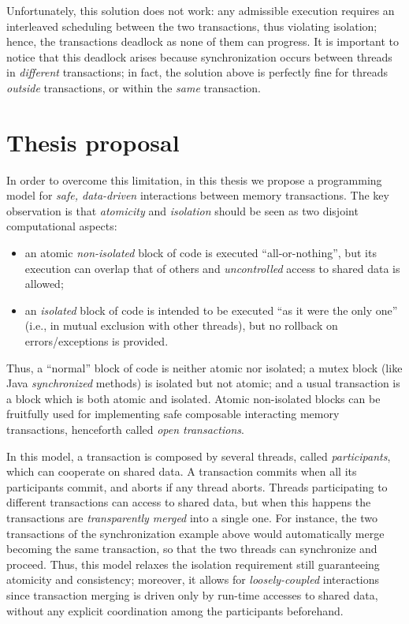 Unfortunately, this solution does not work: any admissible execution requires an interleaved scheduling between the two transactions, thus violating isolation; hence, the transactions deadlock as none of them can progress.
It is important to notice that this deadlock arises because synchronization occurs between threads in \emph{different} transactions;
in fact, the solution above is perfectly fine for threads \emph{outside} transactions, or within the \emph{same} transaction.


\section{Thesis proposal}
In order to overcome this limitation, in this thesis we propose a programming model for \emph{safe, data-driven} interactions between memory transactions.
The key observation is that \emph{atomicity} and \emph{isolation} should be seen as two disjoint computational aspects:
\begin{itemize}
\item an atomic \emph{non-isolated} block of code is executed ``all-or-nothing'', but its execution can overlap that of others and \emph{uncontrolled} access to shared data is allowed;
\item an \emph{isolated} block of code is intended to be executed ``as it were the only one'' (i.e., in mutual exclusion with other threads), but no rollback on errors/exceptions is provided.
\end{itemize}
Thus, a ``normal'' block of code is neither atomic nor isolated; a mutex block (like Java \emph{synchronized} methods) is isolated but not atomic; and a usual transaction is a block which is both atomic and isolated.
Atomic non-isolated blocks can be fruitfully used for implementing safe composable interacting memory transactions, henceforth called \emph{open transactions}.

In this model, a transaction is composed by several threads, called \emph{participants}, which can cooperate on shared data.  A transaction commits when all its participants commit, and aborts if any thread aborts.  Threads participating to different transactions can access to shared data, but when this happens the transactions are \emph{transparently merged} into a single one.  For instance, the two transactions of the synchronization example above would automatically merge becoming the same transaction, so that the two threads can synchronize and proceed.  Thus, this model relaxes the isolation requirement still guaranteeing atomicity and consistency; moreover, it allows for \emph{loosely-coupled} interactions since transaction merging is driven only by run-time accesses to shared data, without any explicit coordination among the participants beforehand.

